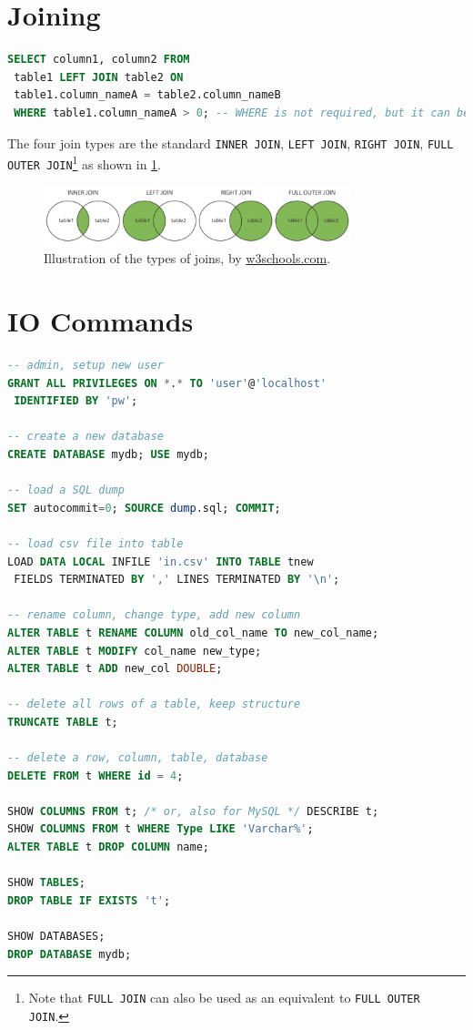 \section{Joining}
\label{sql:join}

\begin{lstlisting}[language=SQL]
SELECT column1, column2 FROM
 table1 LEFT JOIN table2 ON
 table1.column_nameA = table2.column_nameB
 WHERE table1.column_nameA > 0; -- WHERE is not required, but it can be included here
\end{lstlisting}

The four join types are the standard
\texttt{INNER JOIN}, \texttt{LEFT JOIN}, \texttt{RIGHT JOIN},
\texttt{FULL OUTER JOIN}\footnote{Note that \texttt{FULL JOIN} can also be used as an equivalent to \texttt{FULL OUTER JOIN}.} as
shown in \cref{fig:sql:joins}.

\begin{figure}[H]
\centering
\includegraphics[width=0.8\textwidth]{figures/sql/joins.png}
\caption{
Illustration of the types of joins, by \href{https://www.w3schools.com/sql/sql_join.asp}{w3schools.com}.
}
\label{fig:sql:joins}
\end{figure}

\section{IO Commands}
\label{sql:io}

\begin{lstlisting}[language=SQL]
-- admin, setup new user
GRANT ALL PRIVILEGES ON *.* TO 'user'@'localhost'
 IDENTIFIED BY 'pw';

-- create a new database
CREATE DATABASE mydb; USE mydb;

-- load a SQL dump
SET autocommit=0; SOURCE dump.sql; COMMIT;

-- load csv file into table
LOAD DATA LOCAL INFILE 'in.csv' INTO TABLE tnew
 FIELDS TERMINATED BY ',' LINES TERMINATED BY '\n';

-- rename column, change type, add new column
ALTER TABLE t RENAME COLUMN old_col_name TO new_col_name;
ALTER TABLE t MODIFY col_name new_type;
ALTER TABLE t ADD new_col DOUBLE;

-- delete all rows of a table, keep structure
TRUNCATE TABLE t;

-- delete a row, column, table, database
DELETE FROM t WHERE id = 4;

SHOW COLUMNS FROM t; /* or, also for MySQL */ DESCRIBE t;
SHOW COLUMNS FROM t WHERE Type LIKE 'Varchar%';
ALTER TABLE t DROP COLUMN name;

SHOW TABLES;
DROP TABLE IF EXISTS 't';

SHOW DATABASES;
DROP DATABASE mydb;
\end{lstlisting}


